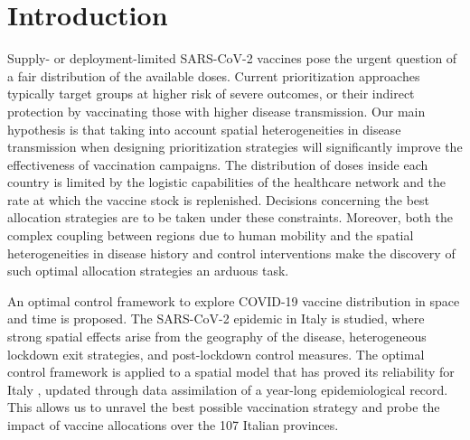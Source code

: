 \section{Introduction}
Supply- or deployment-limited SARS-CoV-2 vaccines\cite[-2\baselineskip]{Khamsi:IfCoronavirusVaccine:2020} pose the urgent question of a fair distribution of the available doses\cite[-1\baselineskip]{NationalAcademiesofSciencesEngineeringandMedicine:FrameworkEquitableAllocation:2020}. Current prioritization approaches typically target groups at higher risk of severe outcomes\cite{Spassiani:VaccinationCriteriaBased:2020, Matrajt:VaccineOptimizationCOVID19:2020a}, or their indirect protection by vaccinating those with higher disease transmission\cite{%
Gallagher:IndirectBenefitsAre:2021,Tuite:AlternativeDoseAllocation:2021}. Our main hypothesis is that taking into account spatial heterogeneities in disease transmission when designing prioritization strategies will significantly improve the effectiveness of vaccination campaigns.
The distribution of doses inside each country is limited by the logistic capabilities of the healthcare network and the rate at which the vaccine stock is replenished. Decisions concerning the best allocation strategies are to be taken under these constraints. Moreover, both the complex coupling between regions due to human mobility and the spatial heterogeneities in disease history and control interventions make the discovery of such optimal allocation strategies an arduous task.

An optimal control framework to explore COVID-19 vaccine distribution in space and time is proposed.
The SARS-CoV-2 epidemic in Italy is studied, where strong spatial effects arise from the geography of the disease, heterogeneous lockdown exit strategies, and post-lockdown control measures\cite[-4.5\baselineskip]{Marziano:RetrospectiveAnalysisItalian:2021}. The optimal control framework is applied to a spatial model that has proved its reliability for Italy%
, updated through data assimilation of a year-long epidemiological record. This allows us to unravel the best possible vaccination strategy and probe the impact of vaccine allocations over the 107 Italian provinces.

